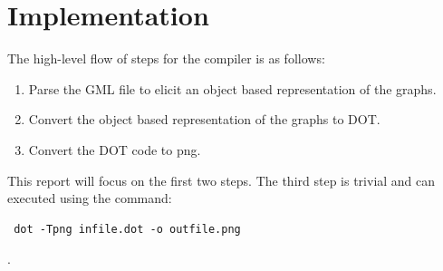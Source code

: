 \documentclass[a4paper]{report}
\begin{document}
\chapter{Implementation}
The high-level flow of steps for the compiler is as follows:
\begin{enumerate}
\item Parse the GML file to elicit an object based representation of the graphs.
\item Convert the object based representation of the graphs to DOT.
\item Convert the DOT code to png.
\end{enumerate}

This report will focus on the first two steps. The third step is trivial and can executed using the command: \begin{verbatim} dot -Tpng infile.dot -o outfile.png \end{verbatim}. 
\end{document}

